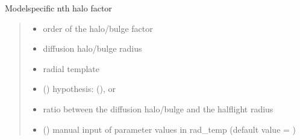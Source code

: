 \documentclass[letterpaper,10pt,english]{sphinxmanual}
\begin{document}
\begin{fulllineitems}
\label{\detokenize{diffsph.profiles:diffsph.profiles.massmodels.h}}
\pysigstartsignatures
{}
\pysigstopsignatures
\sphinxAtStartPar
Model\sphinxhyphen{}specific n\sphinxhyphen{}th halo factor
\begin{quote}\begin{description}
\begin{itemize}
\item {} 
\sphinxAtStartPar
{} \textendash{} order of the halo/bulge factor

\item {} 
\sphinxAtStartPar
{} \textendash{} diffusion halo/bulge radius

\item {} 
\sphinxAtStartPar
{} \textendash{} radial template

\item {} 
\sphinxAtStartPar
{} () \textendash{} hypothesis:  (),  or 

\item {} 
\sphinxAtStartPar
{} \textendash{} ratio between the diffusion halo/bulge and the half\sphinxhyphen{}light radius

\item {} 
\sphinxAtStartPar
{} () \textendash{} manual input of parameter values in rad\_temp (default value = )

\end{itemize}


\end{description}
\end{quote}
\end{fulllineitems}
\end{document}
